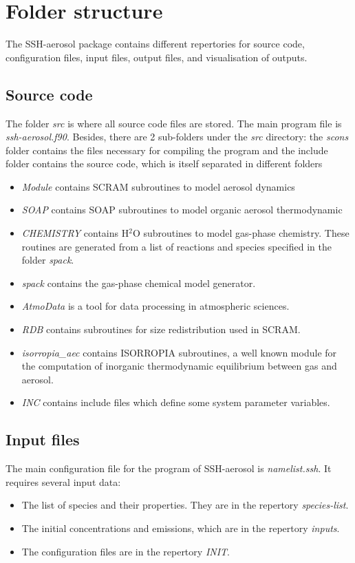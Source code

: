\documentclass[a4paper,11pt]{article}
\begin{document}
\section{Folder structure}

The SSH-aerosol package contains different repertories for source code,  configuration files, input files, output files, and visualisation of outputs.

\subsection{Source code}
The folder {\it{src}} is where all source code files are stored. The main program file is {\it{ssh-aerosol.f90}}.  Besides, there are 2 sub-folders under the {\it{src}} directory: the {\it{scons}} folder contains the files necessary for compiling the program and the include folder contains the source code, which is itself separated in different folders
\begin{itemize}
\item {\it{Module}} contains SCRAM subroutines to model aerosol dynamics
\item {\it{SOAP}} contains SOAP subroutines to model organic aerosol thermodynamic
\item {\it{CHEMISTRY}} contains H$^2$O subroutines to model gas-phase chemistry. These routines are generated from a list of reactions and species specified in the folder {\it{spack}}.
\item {\it{spack}} contains the gas-phase chemical model generator.
\item {\it{AtmoData}} is a tool for data processing in atmospheric sciences.
 \item {\it{RDB}} contains subroutines for size redistribution used in SCRAM.
\item {\it{isorropia\_aec}} contains ISORROPIA subroutines, a well known module for the computation of inorganic thermodynamic equilibrium between gas and aerosol.
\item {\it{INC}} contains include files which define some system parameter variables.
\end {itemize}

\subsection{Input files}
The main configuration file for the program of SSH-aerosol is {\it{namelist.ssh}}. It requires several input data:
\begin{itemize}
\item The list of species and their properties. They are in the repertory {\it{species-list}}. 
\item The initial concentrations and emissions, which are in the repertory {\it{inputs}}.
\item The configuration files are in the repertory {\it{INIT}}.
\end{itemize}
\end{document}
